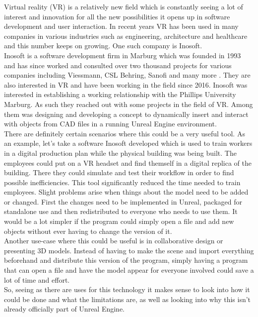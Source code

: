 Virtual reality (\acs{VR}) is a relatively new field which is constantly seeing a lot of interest and innovation for all the new possibilities it opens up in software development and user interaction. In recent years \acs{VR} has been used in many companies in various industries such as engineering, architecture and healthcare and this number keeps on growing\cite{bib:VRFields}. One such company is Inosoft.\\
Inosoft is a software development firm in Marburg which was founded in 1993 and has since worked and consulted over two thousand projects for various companies including Viessmann, CSL Behring, Sanofi and many more \cite{bib:InosoftAbout}. They are also interested in \acs{VR} and have been working in the field since 2016. Inosoft was interested in establishing a working relationship with the Phillips University Marburg. As such they reached out with some projects in the field of \acs{VR}. Among them was designing and developing a concept to dynamically insert and interact with objects from \acs{CAD} files in a running Unreal Engine environment.\\
There are definitely certain scenarios where this could be a very useful tool. As an example, let's take a software Inosoft developed which is used to train workers in a digital production plan while the physical building was being built\cite{bib:InosoftProject}. The employees could put on a VR headset and find themself in a digital replica of the building. There they could simulate and test their workflow in order to find possible inefficiencies. This tool significantly reduced the time needed to train employees. Slight problems arise when things about the model need to be added or changed. First the changes need to be implemented in Unreal, packaged for standalone use and then redistributed to everyone who needs to use them. It would be a lot simpler if the program could simply open a file and add new objects without ever having to change the version of it.\\
Another use-case where this could be useful is in collaborative design or presenting 3D models. Instead of having to make the scene and import everything beforehand and distribute this version of the program, simply having a program that can open a file and have the model appear for everyone involved could save a lot of time and effort.\\
So, seeing as there are uses for this technology it makes sense to look into how it could be done and what the limitations are, as well as looking into why this isn't already officially part of Unreal Engine.


